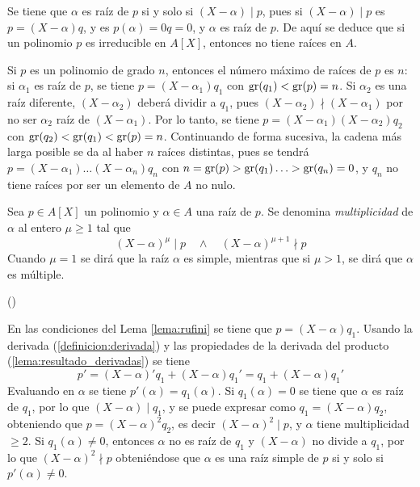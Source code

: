 \begin{obss}
        \item Se tiene que $\alpha$ es raíz de $p$ si y solo si $(X-\alpha)\mid p$, pues si $(X-\alpha)\mid p$ es $p = (X-\alpha)q$, y es $p(\alpha) = 0q  = 0$, y $\alpha$ es raíz de $p$.  De aquí se deduce que si un polinomio $p$ es irreducible en $A[X]$, entonces no tiene raíces en $A$.
        \item Si $p$ es un polinomio de grado $n$, entonces el número máximo de raíces de $p$ es $n$: si $\alpha_1$ es raíz de $p$, se tiene  $p = (X-\alpha_1)q_1$ con $\text{gr}(q_1) < \text{gr}(p) = n$. Si $\alpha_2$ es una raíz diferente, $(X-\alpha_2)$ deberá dividir a $q_1$, pues $(X-\alpha_2)\nmid (X-\alpha_1)$ por no ser $\alpha_2$ raíz  de $(X-\alpha_1)$. Por lo tanto, se tiene $p = (X-\alpha_1)(X-\alpha_2)q_2$ con $\text{gr}(q_2) <\text{gr}(q_1) < \text{gr}(p) = n$. Continuando de forma sucesiva, la cadena más larga posible se da al haber $n$ raíces distintas, pues se tendrá $p =  (X-\alpha_1)\ldots(X-\alpha_n)q_n$ con $n = \text{gr}(p)>\text{gr}(q_1) \ldots> \text{gr}(q_n) = 0$, y $q_n$ no tiene raíces por ser un elemento de $A$ no nulo.  
\end{obss}

\bigskip

\begin{deff}{\cite[p.~185]{GamboaAnillos}}
    Sea $p\in A[X]$ un polinomio y $\alpha \in A$ una raíz de $p$. Se denomina \textit{multiplicidad} de $\alpha$ al entero $\mu\geq1$ tal que \[ (X-\alpha)^\mu\mid p \quad \land \quad  (X-\alpha)^{\mu + 1}\nmid p\]
    Cuando $\mu = 1$ se dirá que la raíz $\alpha$ es simple, mientras que si $\mu>1$, se dirá que $\alpha$ es múltiple.
\end{deff}

\begin{prop}(\cite[p.~185]{GamboaAnillos})\label{proposicion:raiz simple-derivada}
     \item En las condiciones del Lema \ref{lema:rufini} se tiene que $p = (X-\alpha)q_1$. Usando la derivada (\ref{definicion:derivada}) y las propiedades de la derivada del producto (\ref{lema:resultado_derivadas}) se tiene \[p' = (X-\alpha)'q_1 + (X-\alpha)q_1' = q_1 + (X-\alpha)q_1'\]Evaluando en $\alpha$ se tiene $p' (\alpha) = q_1(\alpha)$. Si $q_1 (\alpha) = 0$ se tiene que $\alpha$ es raíz de $q_1$, por lo que $(X-\alpha)\mid q_1$, y se puede expresar como $q_1 = (X-\alpha)q_2$, obteniendo que $p = (X-\alpha)^2q_2$, es decir $(X-\alpha)^2\mid p$, y $\alpha$ tiene multiplicidad $\geq2$. Si $q_1 (\alpha) \neq 0$, entonces $\alpha$ no es raíz de $q_1$ y $(X-\alpha)$ no divide a $q_1$, por lo que $(X-\alpha)^2\nmid p$ obteniéndose que $\alpha$ es una raíz simple de $p$ si y solo si $p'(\alpha) \neq 0$.
\end{prop}

